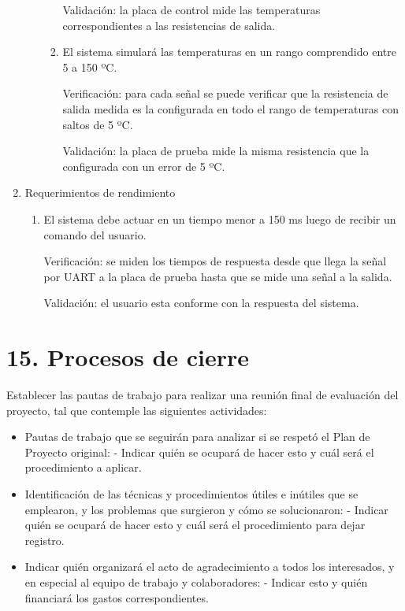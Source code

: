 \documentclass[
11pt, %
codirector, %
]{charter}
\begin{document}
\begin{enumerate}
\begin{enumerate}
\begin{enumerate}
			                  Validación: la placa de control mide las temperaturas correspondientes a las resistencias de salida.
			            \item El sistema simulará las temperaturas en un rango comprendido entre 5 a 150 ºC.

			                  Verificación: para cada señal se puede verificar que la resistencia de salida medida es la configurada en todo el rango de temperaturas con saltos de 5 ºC.

			                  Validación: la placa de prueba mide la misma resistencia que la configurada con un error de 5 ºC.
		            \end{enumerate}
	      \end{enumerate}
	\item Requerimientos de rendimiento
	      \begin{enumerate}
		      \item El sistema debe actuar en un tiempo menor a 150 ms luego de recibir un comando del usuario.

		            Verificación: se miden los tiempos de respuesta desde que llega la señal por UART a la placa de prueba hasta que se mide una señal a la salida.

		            Validación: el usuario esta conforme con la respuesta del sistema.
	      \end{enumerate}
\end{enumerate}

\section{15. Procesos de cierre}
\label{sec:cierre}

Establecer las pautas de trabajo para realizar una reunión final de evaluación del proyecto, tal que contemple las siguientes actividades:

\begin{itemize}
	\item Pautas de trabajo que se seguirán para analizar si se respetó el Plan de Proyecto original:
	      - Indicar quién se ocupará de hacer esto y cuál será el procedimiento a aplicar.
	\item Identificación de las técnicas y procedimientos útiles e inútiles que se emplearon, y los problemas que surgieron y cómo se solucionaron:
	      - Indicar quién se ocupará de hacer esto y cuál será el procedimiento para dejar registro.
	\item Indicar quién organizará el acto de agradecimiento a todos los interesados, y en especial al equipo de trabajo y colaboradores:
	      - Indicar esto y quién financiará los gastos correspondientes.
\end{itemize}
\end{document}
